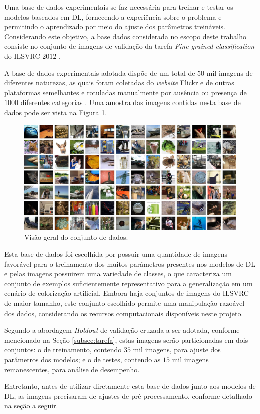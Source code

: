 Uma base de dados experimentais se faz necessária para treinar e testar os modelos baseados em DL, fornecendo a experiência sobre o problema e permitindo o aprendizado por meio do ajuste dos parâmetros treináveis. Considerando este objetivo, a base dados considerada no escopo deste trabalho consiste no conjunto de imagens de validação da tarefa \emph{Fine-grained classification} do ILSVRC $2012$ \cite{ref:image-net}.

A base de dados experimentais adotada dispõe de um total de $50$ mil imagens de diferentes naturezas, as quais foram coletadas do \emph{website} Flickr e de outras plataformas semelhantes e rotuladas manualmente por ausência ou presença de $1000$ diferentes categorias \cite{ILSVRC}. Uma amostra das imagens contidas nesta base de dados pode ser vista na Figura \ref{fig:visaogeral}.

\begin{figure}[h]
	\centering
	\includegraphics[width=1\textwidth]{./img/visaogeral}
	\caption{Visão geral do conjunto de dados.}
	\label{fig:visaogeral}
\end{figure}

Esta base de dados foi escolhida por possuir uma quantidade de imagens favorável para o treinamento dos muitos parâmetros presentes nos modelos de DL e pelas imagens possuirem uma variedade de classes, o que caracteriza um conjunto de exemplos suficientemente representativo para a generalização em um cenário de colorização artificial. Embora haja conjuntos de imagens do ILSVRC de maior tamanho, este conjunto escolhido permite uma manipulação razoável dos dados, considerando os recursos computacionais disponíveis neste projeto.

Segundo a abordagem \emph{Holdout} de validação cruzada a ser adotada, conforme mencionado na Seção \ref{subsec:tarefa}, estas imagens serão particionadas em dois conjuntos: o de treinamento, contendo $35$ mil imagens, para ajuste dos parâmetros dos modelos; e o de testes, contendo as $15$ mil imagens remanescentes, para análise de desempenho.

Entretanto, antes de utilizar diretamente esta base de dados junto aos modelos de DL, as imagens precisaram de ajustes de pré-processamento, conforme detalhado na seção a seguir.
